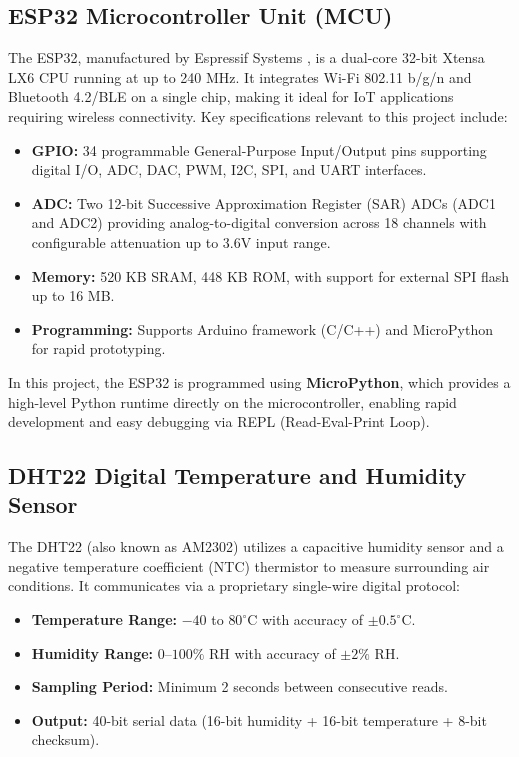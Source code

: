 \documentclass[12pt,a4paper]{report}
\begin{document}
\subsection{ESP32 Microcontroller Unit (MCU)}
The ESP32, manufactured by Espressif Systems \cite{esp32}, is a dual-core 32-bit Xtensa LX6 CPU running at up to 240 MHz. It integrates Wi-Fi 802.11 b/g/n and Bluetooth 4.2/BLE on a single chip, making it ideal for IoT applications requiring wireless connectivity. Key specifications relevant to this project include:
\begin{itemize}
    \item \textbf{GPIO:} 34 programmable General-Purpose Input/Output pins supporting digital I/O, ADC, DAC, PWM, I2C, SPI, and UART interfaces.
    \item \textbf{ADC:} Two 12-bit Successive Approximation Register (SAR) ADCs (ADC1 and ADC2) providing analog-to-digital conversion across 18 channels with configurable attenuation up to 3.6V input range.
    \item \textbf{Memory:} 520 KB SRAM, 448 KB ROM, with support for external SPI flash up to 16 MB.
    \item \textbf{Programming:} Supports Arduino framework (C/C++) and MicroPython for rapid prototyping.
\end{itemize}

In this project, the ESP32 is programmed using \textbf{MicroPython}, which provides a high-level Python runtime directly on the microcontroller, enabling rapid development and easy debugging via REPL (Read-Eval-Print Loop).

\subsection{DHT22 Digital Temperature and Humidity Sensor}
The DHT22 (also known as AM2302) utilizes a capacitive humidity sensor and a negative temperature coefficient (NTC) thermistor to measure surrounding air conditions. It communicates via a proprietary single-wire digital protocol:
\begin{itemize}
    \item \textbf{Temperature Range:} $-40$ to $80^{\circ}$C with accuracy of $\pm 0.5^{\circ}$C.
    \item \textbf{Humidity Range:} $0$--$100\%$ RH with accuracy of $\pm 2\%$ RH.
    \item \textbf{Sampling Period:} Minimum 2 seconds between consecutive reads.
    \item \textbf{Output:} 40-bit serial data (16-bit humidity + 16-bit temperature + 8-bit checksum).
\end{itemize}
\end{document}
